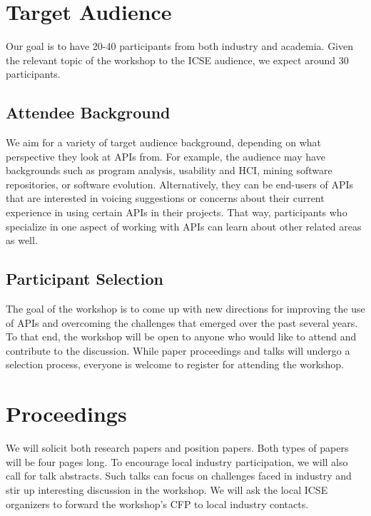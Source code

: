 \documentclass[10pt, conference]{IEEEtran}
\begin{document}
\section{Target Audience}

Our goal is to have 20-40 participants from both industry and academia. Given the relevant topic of the workshop to the ICSE audience, we expect around 30 participants.

\subsection{Attendee Background} 
We aim for a variety of target audience background, depending on what perspective they look at APIs from. For example, the audience may have backgrounds such as program analysis, usability and HCI, mining software repositories, or software evolution. Alternatively, they can be end-users of APIs that are interested in voicing suggestions or concerns about their current experience in using certain APIs in their projects. That way, participants who specialize in one aspect of working with APIs can learn about other related areas as well.

\subsection{Participant Selection}
The goal of the workshop is to come up with new directions for improving the use of APIs and overcoming the challenges that emerged over the past several years. To that end, the workshop will be open to anyone who would like to attend and contribute to the discussion. While paper proceedings and talks will undergo a selection process, everyone is welcome to register for attending the workshop. 

\section{Proceedings}

We will solicit both research papers and position papers. Both types of papers will be four pages long. To encourage local industry participation, we will also call for talk abstracts. Such talks can focus on challenges faced in industry and stir up interesting discussion in the workshop. We will ask the local ICSE organizers to forward the workshop's CFP to local industry contacts.
\end{document}
